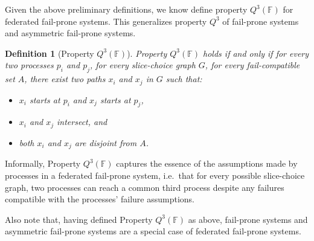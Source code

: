 \documentclass[11pt]{article}
\newtheorem{definition}{Definition}
\begin{document}
Given the above preliminary definitions, we know define property $Q^3(\mathbb{F})$ for federated fail-prone systems. This generalizes property $Q^3$ of fail-prone systems and asymmetric fail-prone systems.

\begin{definition}[Property $Q^3(\mathbb{F})$]
  Property $Q^3(\mathbb{F})$ holds if and only if for every two processes $p_i$ and $p_j$, for every slice-choice graph $G$, for every fail-compatible set $A$, there exist two paths $x_i$ and $x_j$ in $G$ such that:
  \begin{itemize}
    \item $x_i$ starts at $p_i$ and $x_j$ starts at $p_j$,
    \item $x_i$ and $x_j$ intersect, and
    \item both $x_i$ and $x_j$ are disjoint from $A$.
  \end{itemize}
\end{definition}

Informally, Property $Q^3(\mathbb{F})$ captures the essence of the assumptions made by processes in a federated fail-prone system, i.e.\ that for every possible slice-choice graph, two processes can reach a common third process despite any failures compatible with the processes' failure assumptions.

Also note that, having defined Property $Q^3(\mathbb{F})$ as above, fail-prone systems and asymmetric fail-prone systems are a special case of federated fail-prone systems.
\end{document}
